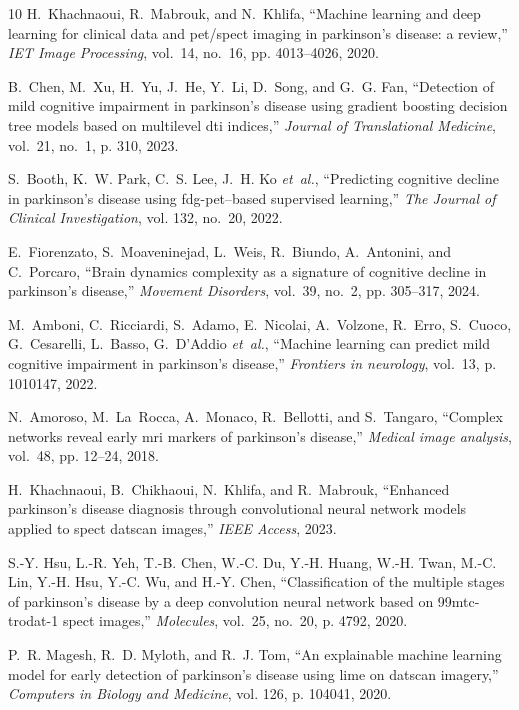 \documentclass[twocolumn]{article}
\begin{document}
\begin{thebibliography}{10}
H.~Khachnaoui, R.~Mabrouk, and N.~Khlifa, ``Machine learning and deep learning
  for clinical data and pet/spect imaging in parkinson's disease: a review,''
  \emph{IET Image Processing}, vol.~14, no.~16, pp. 4013--4026, 2020.

B.~Chen, M.~Xu, H.~Yu, J.~He, Y.~Li, D.~Song, and G.~G. Fan, ``Detection of
  mild cognitive impairment in parkinson’s disease using gradient boosting
  decision tree models based on multilevel dti indices,'' \emph{Journal of
  Translational Medicine}, vol.~21, no.~1, p. 310, 2023.

S.~Booth, K.~W. Park, C.~S. Lee, J.~H. Ko \emph{et~al.}, ``Predicting cognitive
  decline in parkinson’s disease using fdg-pet--based supervised learning,''
  \emph{The Journal of Clinical Investigation}, vol. 132, no.~20, 2022.

E.~Fiorenzato, S.~Moaveninejad, L.~Weis, R.~Biundo, A.~Antonini, and
  C.~Porcaro, ``Brain dynamics complexity as a signature of cognitive decline
  in parkinson's disease,'' \emph{Movement Disorders}, vol.~39, no.~2, pp.
  305--317, 2024.

M.~Amboni, C.~Ricciardi, S.~Adamo, E.~Nicolai, A.~Volzone, R.~Erro, S.~Cuoco,
  G.~Cesarelli, L.~Basso, G.~D'Addio \emph{et~al.}, ``Machine learning can
  predict mild cognitive impairment in parkinson's disease,'' \emph{Frontiers
  in neurology}, vol.~13, p. 1010147, 2022.

N.~Amoroso, M.~La~Rocca, A.~Monaco, R.~Bellotti, and S.~Tangaro, ``Complex
  networks reveal early mri markers of parkinson’s disease,'' \emph{Medical
  image analysis}, vol.~48, pp. 12--24, 2018.

H.~Khachnaoui, B.~Chikhaoui, N.~Khlifa, and R.~Mabrouk, ``Enhanced
  parkinson’s disease diagnosis through convolutional neural network models
  applied to spect datscan images,'' \emph{IEEE Access}, 2023.

S.-Y. Hsu, L.-R. Yeh, T.-B. Chen, W.-C. Du, Y.-H. Huang, W.-H. Twan, M.-C. Lin,
  Y.-H. Hsu, Y.-C. Wu, and H.-Y. Chen, ``Classification of the multiple stages
  of parkinson’s disease by a deep convolution neural network based on
  99mtc-trodat-1 spect images,'' \emph{Molecules}, vol.~25, no.~20, p. 4792,
  2020.

P.~R. Magesh, R.~D. Myloth, and R.~J. Tom, ``An explainable machine learning
  model for early detection of parkinson's disease using lime on datscan
  imagery,'' \emph{Computers in Biology and Medicine}, vol. 126, p. 104041,
  2020.


\end{thebibliography}
\end{document}
